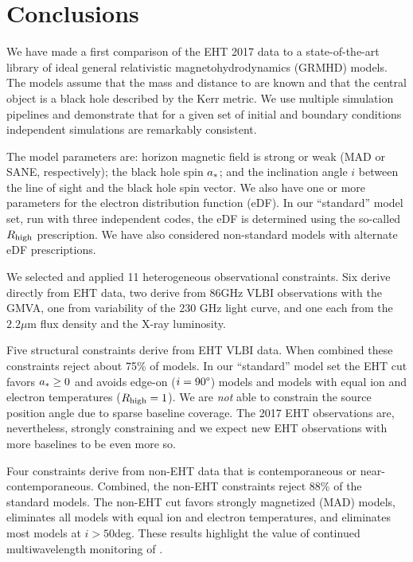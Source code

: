 \section{Conclusions}
\label{sec:conclusions}

We have made a first comparison of the EHT 2017 \sgra data to a state-of-the-art library of ideal general relativistic magnetohydrodynamics (GRMHD) models.  The models assume that the mass and distance to \sgra are known and that the central object is a black hole described by the Kerr metric. We use multiple simulation pipelines and demonstrate that for a given set of initial and boundary conditions independent simulations are remarkably consistent.

The model parameters are: horizon magnetic field is strong or weak (MAD or SANE, respectively); the black hole spin $a_*$; and the inclination angle $i$ between the line of sight and the black hole spin vector.  We also have one or more parameters for the electron distribution function (eDF).  In our ``standard'' model set, run with three independent codes, the eDF is determined using the so-called $R_\mathrm{high}$ prescription.  We have also considered non-standard models with alternate eDF prescriptions.

We selected and applied 11 heterogeneous observational constraints.  Six derive directly from EHT data, two derive from 86GHz VLBI observations with the GMVA, one from variability of the 230 GHz light curve, and one each from the $2.2\mu$m flux density and the X-ray luminosity.

Five structural constraints derive from EHT VLBI data.  When combined these constraints reject about 75\% of models.  In our ``standard'' model set the EHT cut favors $a_* \ge 0$ and avoids edge-on ($i = 90\degree$) models and models with equal ion and electron temperatures ($R_\mathrm{high} = 1$).  We are {\em not} able to constrain the source position angle due to sparse baseline coverage.  The 2017 EHT observations are, nevertheless, strongly constraining and we expect new EHT observations with more baselines to be even more so.

Four constraints derive from non-EHT data that is contemporaneous or near-contemporaneous.  Combined, the non-EHT constraints reject 88\% of the standard models.  The non-EHT cut favors strongly magnetized (MAD) models, eliminates all models with equal ion and electron temperatures, and eliminates most models at $i > 50$deg.  These results highlight the value of continued multiwavelength monitoring of \sgra.

